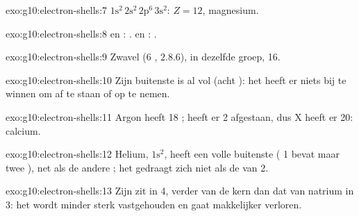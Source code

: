 \begin{solution}{exo:g10:electron-shells:7}
$1\mathrm{s}^2\,2\mathrm{s}^2\,2\mathrm{p}^6\,3\mathrm{s}^2$: $Z = 12$,
magnesium.
\end{solution}

\begin{solution}{exo:g10:electron-shells:8}
 en : .  en :
.
\end{solution}

\begin{solution}{exo:g10:electron-shells:9}
Zwavel (6 , $2.8.6$), in dezelfde groep, 16.
\end{solution}

\begin{solution}{exo:g10:electron-shells:10}
Zijn buitenste  is al vol (acht ): het heeft er niets bij
te winnen om  af te staan of op te nemen.
\end{solution}

\begin{solution}{exo:g10:electron-shells:11}
Argon heeft 18 ;  heeft er 2 afgestaan, dus X heeft
er 20: calcium.
\end{solution}

\begin{solution}{exo:g10:electron-shells:12}
Helium, $1\mathrm{s}^2$, heeft een volle buitenste  ( 1 bevat
maar twee ), net als de andere ; het gedraagt zich
niet als de  van  2.
\end{solution}

\begin{solution}{exo:g10:electron-shells:13}
Zijn  zit in  4, verder van de kern dan dat van
natrium in  3: het wordt minder sterk vastgehouden en gaat
makkelijker verloren.
\end{solution}

